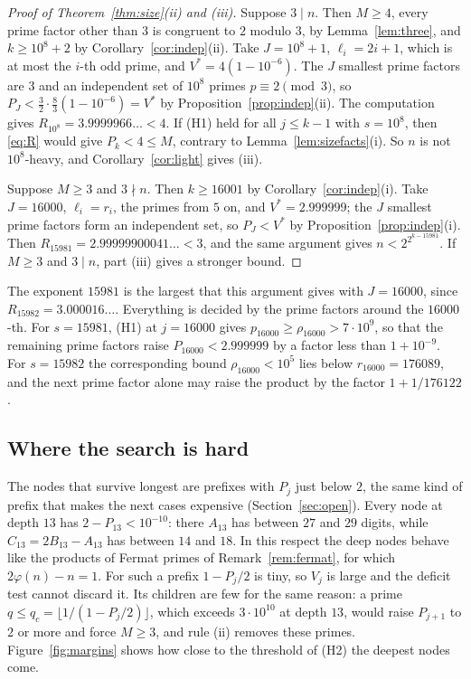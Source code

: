 \documentclass[screen,reqno]{aomart}
\numberwithin{equation}{section}
\theoremstyle{plain}
\theoremstyle{definition}
\theoremstyle{remark}
\begin{document}
\begin{proof}[Proof of Theorem~\textup{\ref{thm:size}(ii)} and
\textup{(iii)}]
Suppose $3\mid n$. Then $M\ge4$, every prime factor other than $3$ is
congruent to $2$ modulo $3$, by Lemma~\ref{lem:three}, and
$k\ge10^8+2$ by Corollary~\ref{cor:indep}(ii). Take $J=10^8+1$,
$\ell_i=2i+1$, which is at most the $i$-th odd prime, and
$V^*=4(1-10^{-6})$. The $J$ smallest prime factors are $3$ and an
independent set of $10^8$ primes $p\equiv2\pmod3$, so
$P_J<\frac32\cdot\frac83(1-10^{-6})=V^*$ by
Proposition~\ref{prop:indep}(ii). The computation gives
$R_{10^8}=3.9999966\ldots<4$. If (H1) held for all $j\le k-1$ with
$s=10^8$, then \eqref{eq:R} would give $P_k<4\le M$, contrary to
Lemma~\ref{lem:sizefacts}(i). So $n$ is not $10^8$-heavy, and
Corollary~\ref{cor:light} gives (iii).

Suppose $M\ge3$ and $3\nmid n$. Then $k\ge16001$ by
Corollary~\ref{cor:indep}(i). Take $J=16000$, $\ell_i=r_i$, the primes
from $5$ on, and $V^*=2.999999$; the $J$ smallest prime factors form an
independent set, so $P_J<V^*$ by Proposition~\ref{prop:indep}(i).
Then $R_{15981}=2.99999900041\ldots<3$, and the same argument gives
$n<2^{2^{k-15981}}$. If $M\ge3$ and $3\mid n$, part (iii) gives a
stronger bound.
\end{proof}

The exponent $15981$ is the largest that this argument gives with
$J=16000$, since $R_{15982}=3.000016\ldots$. Everything is decided by
the prime factors around the $16000$-th. For $s=15981$, (H1) at
$j=16000$ gives $p_{16000}\ge\rho_{16000}>7\cdot10^9$, so that the
remaining prime factors raise $P_{16000}<2.999999$ by a factor less
than $1+10^{-9}$. For $s=15982$ the corresponding bound
$\rho_{16000}<10^5$ lies below $r_{16000}=176089$, and the next prime
factor alone may raise the product by the factor $1+1/176122$.

\subsection{Where the search is hard}\label{sec:hard}
The nodes that survive longest are prefixes with $P_j$ just below $2$,
the same kind of prefix that makes the next cases expensive
(Section~\ref{sec:open}). Every node at depth $13$ has
$2-P_{13}<10^{-10}$: there $A_{13}$ has between $27$ and $29$ digits,
while $C_{13}=2B_{13}-A_{13}$ has between $14$ and $18$. In this
respect the deep nodes behave like the products of Fermat primes of
Remark~\ref{rem:fermat}, for which $2\varphi(n)-n=1$. For such a
prefix $1-P_j/2$ is tiny, so $V_j$ is large and the deficit test
cannot discard it. Its children are few for the same reason: a prime
$q\le q_c=\lfloor1/(1-P_j/2)\rfloor$, which exceeds $3\cdot10^{10}$ at
depth $13$, would raise $P_{j+1}$ to $2$ or more and force $M\ge3$, and
rule (ii) removes these primes. Figure~\ref{fig:margins} shows how
close to the threshold of (H2) the deepest nodes come.
\end{document}
